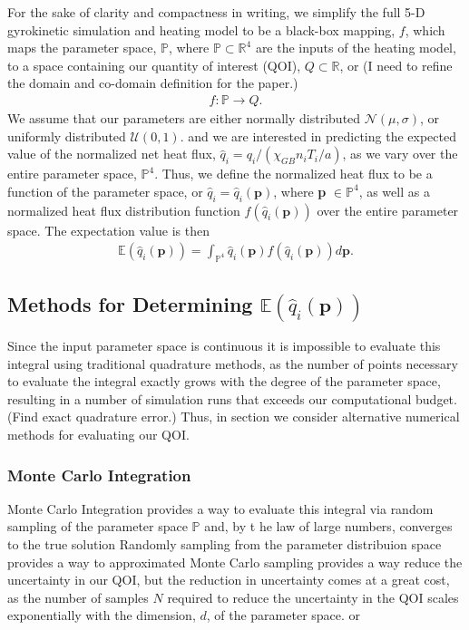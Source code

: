 \documentclass{article}
\begin{document}
\vspace{0.01cm}
\noindent

For the sake of clarity and compactness in writing, we simplify the full 5-D gyrokinetic simulation and heating model to be a black-box mapping, $f$, which maps the parameter space, $\mathbb{P}$, where $\mathbb{P} \subset \mathbb{R}^4$ are the inputs of the heating model, to a space containing our quantity of interest  (QOI), $Q\subset \mathbb{R}$, or
(I need to refine the domain and co-domain definition for the paper.)
\begin{align*}
f:\mathbb{P} \to Q.
\end{align*}
We assume that our parameters are either normally distributed $\mathcal{N}(\mu, \sigma)$, or uniformly distributed $\mathcal{U}(0,1)$. and we are interested in predicting the expected value of the normalized net heat flux, $\hat{q}_i = q_i/(\chi_{GB}n_iT_i/a)$, as we vary over the entire parameter space, $\mathbb{P}^4$. Thus, we define the normalized heat flux to be a function of the parameter space, or $\hat{q}_i = \hat{q}_i(\textbf{p})$, where \textbf{p} $\in \mathbb{P}^4$, as well as a normalized heat flux distribution function $f(\hat{q}_i(\textbf{p}))$ over the entire parameter space. The expectation value is then
\begin{align*}
\mathbb{E}(\hat{q}_i(\textbf{p})) = \int_{\mathbb{P}^4}\hat{q}_i(\textbf{p}) f(\hat{q}_i(\textbf{p}))d\textbf{p}.
\end{align*}
\subsection{Methods for Determining $\mathbb{E}(\hat{q}_i(\textbf{p}))$}
Since the input parameter space is continuous it is impossible to evaluate this integral using traditional quadrature methods, as the number of points necessary to evaluate the integral exactly grows with the degree of the parameter space, resulting in a number of simulation runs that exceeds our computational budget.  (Find exact quadrature error.) Thus, in section we consider alternative numerical methods for evaluating our QOI.
\subsubsection{Monte Carlo Integration}
Monte Carlo Integration provides a way to evaluate this integral via random sampling of the parameter space $\mathbb{P}$ 	and, by t he law of large numbers, converges to the true solution
 Randomly sampling from the parameter distribuion space provides a way to approximated 
Monte Carlo sampling provides a way reduce the uncertainty in our QOI, but the reduction in uncertainty comes at a great cost, as the number of samples $N$ required to reduce the uncertainty in the QOI scales exponentially with the dimension, $d$, of the parameter space. or
\end{document}
